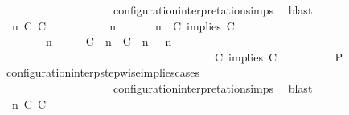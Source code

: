 \begin{isabellebody}
\ \ \ \ \ \ \ \ \ \ \ \ \ \ \ \ \ \ \ \ configuration{\isacharunderscore}interpretation{\isachardot}simps\ \isamarkupfalse%
\ blast\isanewline
\ \ \ \ \isamarkupfalse%
\isanewline
\ \ \ \ \ \ \isamarkupfalse%
\ {\isasymGamma}\ n\ C\ C\ {\isasymPsi}\ {\isasymPhi}\isanewline
\ \ \ \ \ \ \isamarkupfalse%
\ {\isacartoucheopen}{\isacharparenleft}{\isasymGamma}\ n\ {\isasymturnstile}\ {\isasymPsi}\ {\isasymtriangleright}\ {\isasymPhi}\ {\isacharequal}\ {\isacharparenleft}{\isasymGamma}{\isacharcomma}\ n\ {\isasymturnstile}\ {\isacharparenleft}{\isacharparenleft}C\ implies\ C\ {\isacharhash}\ {\isasymPsi}{\isacharparenright}\ {\isasymtriangleright}\ {\isasymPhi}{\isacharparenright}{\isacartoucheclose}\isanewline
\ \ \ \ \ \ \ {\isacartoucheopen}{\isacharparenleft}{\isasymGamma}\ n\ {\isasymturnstile}\ {\isasymPsi}\ {\isasymtriangleright}\ {\isasymPhi}\ {\isacharequal}\ {\isacharparenleft}{\isacharparenleft}{\isacharparenleft}C\ {\isasymUp}\ n{\isacharparenright}\ {\isacharhash}\ {\isacharparenleft}C\ {\isasymUp}\ n{\isacharparenright}\ {\isacharhash}\ {\isasymGamma}{\isacharparenright}{\isacharcomma}\ n\isanewline
\ \ \ \ \ \ \ \ \ \ \ \ \ \ \ \ \ \ \ \ \ \ \ \ \ \ \ \ \ \ \ \ \ \ \ {\isasymturnstile}\ {\isasymPsi}\ {\isasymtriangleright}\ {\isacharparenleft}{\isacharparenleft}C\ implies\ C\ {\isacharhash}\ {\isasymPhi}{\isacharparenright}{\isacharparenright}{\isacartoucheclose}\isanewline
\ \ \ \ \ \ \isamarkupfalse%
\ {\isacharquery}P\ \isamarkupfalse%
\ configuration{\isacharunderscore}interp{\isacharunderscore}stepwise{\isacharunderscore}implies{\isacharunderscore}cases\isanewline
\ \ \ \ \ \ \ \ \ \ \ \ \ \ \ \ \ \ \ \ configuration{\isacharunderscore}interpretation{\isachardot}simps\ \isamarkupfalse%
\ blast\isanewline
\ \ \ \ \isamarkupfalse%
\isanewline
\ \ \ \ \ \ \isamarkupfalse%
\ {\isasymGamma}\ n\ C\ C\ {\isasymPsi}\ {\isasymPhi}\isanewline

\end{isabellebody}
